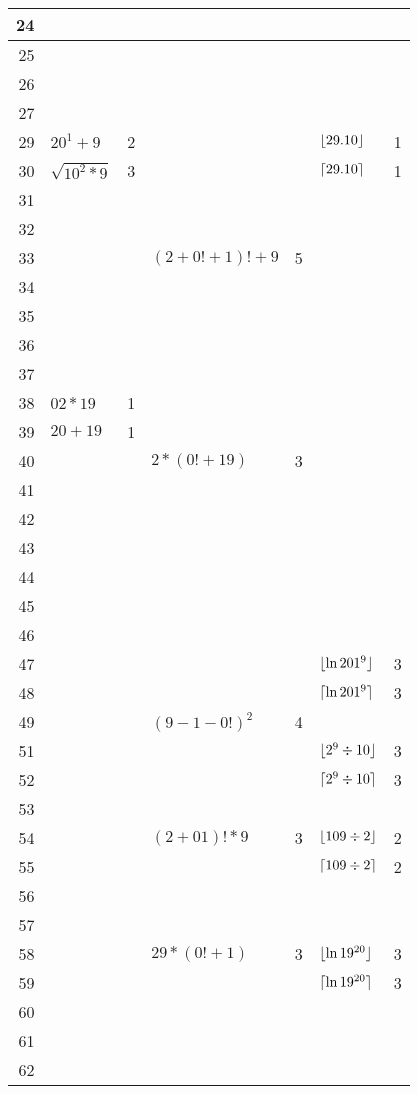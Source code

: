 \begin{longtable}{r l r l r l r}
24 & & \\ \midrule
25 & & \\ \midrule
26 & & \\ \midrule
27 & & \\ \midrule
29 & $20^1+9$ & 2 & & & $\lfloor29.10\rfloor$ & 1\\ \midrule
\midrule
30 & $\sqrt{10^2*9}$ & 3 & & & $\lceil29.10\rceil$ & 1\\ \midrule
31 & & \\ \midrule
32 & & \\ \midrule
33 & & & $(2+0!+1)!+9$ & 5 \\ \midrule
34 & & \\ \midrule
35 & & \\ \midrule
36 & & \\ \midrule
37 & & \\ \midrule
38 & $02*19$ & 1 \\ \midrule
39 & $20+19$ & 1 \\ \midrule
\midrule
40 & & & $2*(0!+19)$ & 3 \\ \midrule
41 & & \\ \midrule
42 & & \\ \midrule
43 & & \\ \midrule
44 & & \\ \midrule
45 & & \\ \midrule
46 & & \\ \midrule
47 & & & & & $\lfloor\ln 201^9\rfloor$ & 3 \\ \midrule
48 & & & & & $\lceil\ln 201^9\rceil$ & 3 \\ \midrule
49 & & & ${(9-1-0!)}^2$ & 4 \\ \midrule
\midrule
51 & & & & & $\lfloor2^9\div10\rfloor$ & 3 \\ \midrule
52 & & & & & $\lceil2^9\div10\rceil$ & 3 \\ \midrule
53 & & \\ \midrule
54 & & & $(2+01)!*9$ & 3 & $\lfloor109\div2\rfloor$ & 2 \\ \midrule
55 & & & & & $\lceil109\div2\rceil$ & 2 \\ \midrule
56 & & \\ \midrule
57 & & \\ \midrule
58 & & & $29*(0!+1)$ & 3 & $\lfloor\ln 19^{20}\rfloor$ & 3 \\ \midrule
59 & & & & & $\lceil\ln 19^{20}\rceil$ & 3 \\ \midrule
\midrule
60 & & \\ \midrule
61 & & \\ \midrule
62 & & \\ \midrule

\end{longtable}
